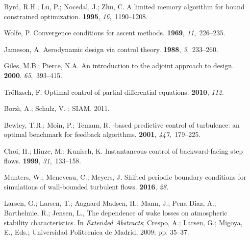 \documentclass[energies,article,submit,moreauthors,latex,10pt,a4paper]{mdpi}
\begin{document}
\begin{thebibliography}{999}
	Byrd, R.H.; Lu, P.; Nocedal, J.; Zhu, C.
	\newblock A limited memory algorithm for bound constrained optimization.
	 {\bf 1995}, {\em
		16},~1190--1208.
	
	Wolfe, P.
	\newblock Convergence conditions for ascent methods.
	 {\bf 1969}, {\em 11},~226--235.
	
	Jameson, A.
	\newblock Aerodynamic design via control theory.
	 {\bf 1988}, {\em 3},~233--260.
	
	Giles, M.B.; Pierce, N.A.
	\newblock An introduction to the adjoint approach to design.
	 {\bf 2000}, {\em 65},~393--415.
	
	Tr{\"o}ltzsch, F.
	\newblock Optimal control of partial differential equations.
	 {\bf 2010}, {\em 112}.
	
	Borz{\`\i}, A.; Schulz, V.
	; SIAM,  2011.
	
	Bewley, T.R.; Moin, P.; Temam, R.
	-based predictive control of turbulence: an optimal benchmark
	for feedback algorithms.
	 {\bf 2001}, {\em 447},~179--225.
	
	Choi, H.; Hinze, M.; Kunisch, K.
	\newblock Instantaneous control of backward-facing step flows.
	 {\bf 1999}, {\em 31},~133--158.
	
	Munters, W.; Meneveau, C.; Meyers, J.
	\newblock Shifted periodic boundary conditions for simulations of wall-bounded
	turbulent flows.
	 {\bf 2016}, {\em 28}.
	
	Larsen, G.; Larsen, T.; {Aagaard Madsen}, H.; Mann, J.; {Pena Diaz}, A.;
	Barthelmie, R.; Jensen, L., The dependence of wake losses on atmospheric
	stability characteristics.
	\newblock In {\em Extended Abstracts}; Crespo, A.; Larsen, G.; Migoya, E.,
	Eds.; Universidad Politecnica de Madrid,  2009; pp. 35--37.
	

\end{thebibliography}
\end{document}
